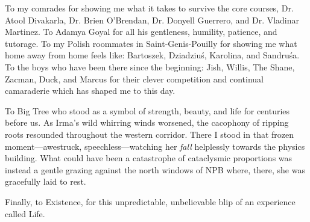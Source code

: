 To my comrades for showing me what it takes to survive the core courses, Dr. Atool Divakarla, Dr. Brien O'Brendan, Dr. Donyell Guerrero, and Dr. Vladinar Martinez.
To Adamya Goyal for all his gentleness, humility, patience, and tutorage.
To my Polish roommates in Saint-Genis-Pouilly for showing me what home away from home feels like: Bartoszek, Dziadziuś, Karolina, and Sandruśa.
To the boys who have been there since the beginning: Jish, Willis, The Shane, Zacman, Duck, and Marcus for their clever competition and continual camaraderie which has shaped me to this day.

To Big Tree who stood as a symbol of strength, beauty, and life for centuries before us.
As Irma's wild whirring winds worsened, the cacophony of ripping roots resounded throughout the western corridor.
There I stood in that frozen moment---awestruck, speechless---watching her \emph{fall} helplessly towards the physics building.
What could have been a catastrophe of cataclysmic proportions was instead a gentle grazing against the north windows of NPB where, there, she was gracefully laid to rest.

Finally, to Existence, for this unpredictable, unbelievable blip of an experience called Life.

